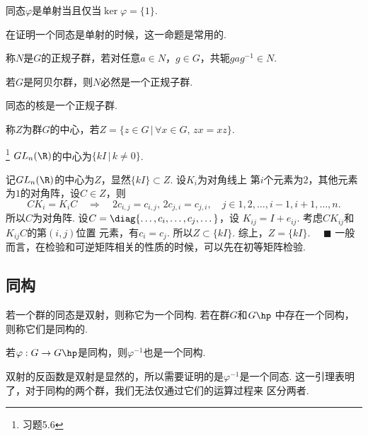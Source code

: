   \begin{cor}[单射]
    同态$\varphi$是单射当且仅当$\ker\varphi = \{1\}$.
  \end{cor}
  \remark
    在证明一个同态是单射的时候，这一命题是常用的.

  \begin{defi}[正规子群]
    称$N$是$G$的正规子群，若对任意$a\in N$，$g\in G$，共轭$gag^{-1}\in N$.
  \end{defi}
  \remark
    若$G$是阿贝尔群，则$N$必然是一个正规子群.

  \begin{thm}
    同态的核是一个正规子群.
  \end{thm}

  \begin{defi}[中心]
    称$Z$为群$G$的中心，若$Z=\{z\in G\,|\, \forall x\in G,\,zx=xz\}$.
  \end{defi}

  \begin{pos}
    \footnote{习题5.6}
    $GL_n(\R)$的中心为$\{kI\,|\,k\ne 0\}$.
  \end{pos}
  \proof
    记$GL_n(\R)$的中心为$Z$，显然$\{kI\}\subset Z$. 设$K_i$为对角线上
    第$i$个元素为$2$，其他元素为$1$的对角阵，设$C\in Z$，则
    \[
      CK_i = K_iC \quad\Rightarrow\quad
      2c_{i, j} = c_{i, j},\,2c_{j, i} = c_{j, i},
      \quad j\in{1,2,\dots,i-1,i+1,\dots,n}.
    \]
    所以$C$为对角阵. 设$C=\diag{\dots,c_i,\dots,c_j,\dots}$，设
    $K_{ij} = I+e_{ij}$. 考虑$CK_{ij}$和$K_{ij}C$的第$(i,j)$位置
    元素，有$c_i=c_j$. 所以$Z\subset\{kI\}$. 综上，$Z=\{kI\}$.
    $\quad\blacksquare$
  \remark
    一般而言，在检验和可逆矩阵相关的性质的时候，可以先在初等矩阵检验.

\subsection{同构}

  \begin{defi}
    若一个群的同态是双射，则称它为一个同构. 若在群$G$和$G\hp$
    中存在一个同构，则称它们是同构的.
  \end{defi}

  \begin{lemma}
    若$\varphi:G\to G\hp$是同构，则$\varphi^{-1}$也是一个同构.
  \end{lemma}
  \proof
    双射的反函数是双射是显然的，所以需要证明的是$\varphi^{-1}$是一个同态.
  \remark
    这一引理表明了，对于同构的两个群，我们无法仅通过它们的运算过程来
    区分两者.

